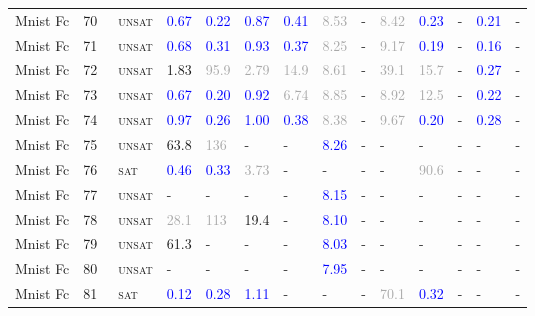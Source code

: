 \begin{center}
{\begin{longtable}{@{}llllllllllllll@{}}
Mnist Fc & 70 & ~\textsc{unsat} & \textcolor{blue}{0.67} & \textcolor{blue}{0.22} & \textcolor{blue}{0.87} & \textcolor{blue}{0.41} & \textcolor{darkgray}{8.53} & - & \textcolor{darkgray}{8.42} & \textcolor{blue}{0.23} & - & \textcolor{blue}{0.21} & - \\
Mnist Fc & 71 & ~\textsc{unsat} & \textcolor{blue}{0.68} & \textcolor{blue}{0.31} & \textcolor{blue}{0.93} & \textcolor{blue}{0.37} & \textcolor{darkgray}{8.25} & - & \textcolor{darkgray}{9.17} & \textcolor{blue}{0.19} & - & \textcolor{blue}{0.16} & - \\
Mnist Fc & 72 & ~\textsc{unsat} & \textcolor{second}{1.83} & \textcolor{darkgray}{95.9} & \textcolor{darkgray}{2.79} & \textcolor{darkgray}{14.9} & \textcolor{darkgray}{8.61} & - & \textcolor{darkgray}{39.1} & \textcolor{darkgray}{15.7} & - & \textcolor{blue}{0.27} & - \\
Mnist Fc & 73 & ~\textsc{unsat} & \textcolor{blue}{0.67} & \textcolor{blue}{0.20} & \textcolor{blue}{0.92} & \textcolor{darkgray}{6.74} & \textcolor{darkgray}{8.85} & - & \textcolor{darkgray}{8.92} & \textcolor{darkgray}{12.5} & - & \textcolor{blue}{0.22} & - \\
Mnist Fc & 74 & ~\textsc{unsat} & \textcolor{blue}{0.97} & \textcolor{blue}{0.26} & \textcolor{blue}{1.00} & \textcolor{blue}{0.38} & \textcolor{darkgray}{8.38} & - & \textcolor{darkgray}{9.67} & \textcolor{blue}{0.20} & - & \textcolor{blue}{0.28} & - \\
Mnist Fc & 75 & ~\textsc{unsat} & \textcolor{second}{63.8} & \textcolor{darkgray}{136} & - & - & \textcolor{blue}{8.26} & - & - & - & - & - & - \\
Mnist Fc & 76 & ~\textsc{sat} & \textcolor{blue}{0.46} & \textcolor{blue}{0.33} & \textcolor{darkgray}{3.73} & - & - & - & - & \textcolor{darkgray}{90.6} & - & - & - \\
Mnist Fc & 77 & ~\textsc{unsat} & - & - & - & - & \textcolor{blue}{8.15} & - & - & - & - & - & - \\
Mnist Fc & 78 & ~\textsc{unsat} & \textcolor{darkgray}{28.1} & \textcolor{darkgray}{113} & \textcolor{second}{19.4} & - & \textcolor{blue}{8.10} & - & - & - & - & - & - \\
Mnist Fc & 79 & ~\textsc{unsat} & \textcolor{second}{61.3} & - & - & - & \textcolor{blue}{8.03} & - & - & - & - & - & - \\
Mnist Fc & 80 & ~\textsc{unsat} & - & - & - & - & \textcolor{blue}{7.95} & - & - & - & - & - & - \\
Mnist Fc & 81 & ~\textsc{sat} & \textcolor{blue}{0.12} & \textcolor{blue}{0.28} & \textcolor{blue}{1.11} & - & - & - & \textcolor{darkgray}{70.1} & \textcolor{blue}{0.32} & - & - & - \\

\end{longtable}}
\end{center}
